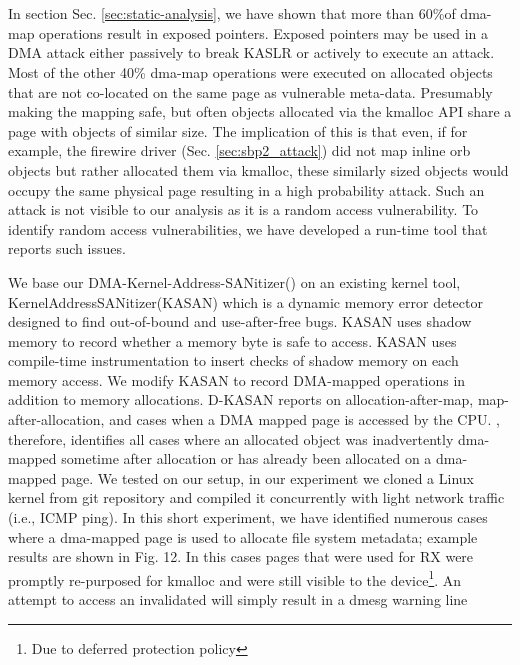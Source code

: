 \section{\dkasan}\label{sec:dma-kasan}

In section Sec. \ref{sec:static-analysis}, we have shown that more than 60\%of dma-map operations result in exposed pointers. Exposed pointers may be used in a DMA attack either passively to break KASLR or actively to execute an attack. Most of the other 40\% dma-map operations were executed on allocated objects that are not co-located on the same page as vulnerable meta-data. Presumably making the mapping safe, but often objects allocated via the kmalloc API share a page with objects of similar size. The implication of this is that even, if for example, the firewire driver (Sec. \ref{sec:sbp2_attack}) did not map inline orb objects but rather allocated them via kmalloc, these similarly sized objects would occupy the same physical page resulting in a high probability attack. Such an attack is not visible to our \tool analysis as it is a random access vulnerability. To identify random access vulnerabilities, we have developed a run-time tool that reports such issues. 

We base our DMA-Kernel-Address-SANitizer(\dkasan) on an existing kernel tool, KernelAddressSANitizer(KASAN)\cite{kasan} which is a dynamic memory error detector designed to find out-of-bound and use-after-free bugs. KASAN uses shadow memory to record whether a memory byte is safe to access. KASAN uses compile-time instrumentation to insert checks of shadow memory on each memory access. We modify KASAN to record DMA-mapped operations in addition to memory allocations. D-KASAN reports on allocation-after-map, map- after-allocation, and cases when a DMA mapped page is accessed by the CPU. \dkasan, therefore, identifies all cases where an allocated object was inadvertently dma-mapped sometime after allocation or has already been allocated on a dma-mapped page. We tested \dkasan on our setup, in our experiment we cloned a Linux kernel from git repository and compiled it concurrently with light network traffic (i.e., ICMP ping). In this short experiment, we have identified numerous cases where a dma-mapped page is used to allocate file system metadata; example results are shown in Fig. 12. In this cases pages that were used for RX were promptly re-purposed for kmalloc and were still visible to the device\footnote{Due to deferred protection policy}. An attempt to access an invalidated \iova will simply result in a dmesg warning line

